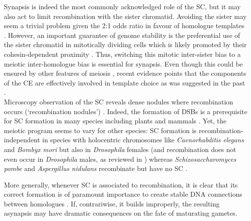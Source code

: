 Synapsis is indeed the most commonly acknowledged role of the SC, but it may also act to limit recombination with the sister chromatid.
Avoiding the sister may seem a trivial problem given the 2:1 odds ratio in favour of homologue templates \citep{lao2010trying}. 
However, an important guarantee of genome stability is the preferential use of the sister chromatid in mitotically dividing cells \citep{kadyk1992sister,bzymek2010double} which is likely promoted by their cohesin-dependent proximity \citep{sjogren2010sphase}.
Thus, switching this mitotic inter-sister bias to a meiotic inter-homologue bias is essential for synapsis.
Even though this could be ensured by other features of meiosis \citep[reviewed in \citealp{humphryes2014non}]{schwacha1997interhomolog, goldfarb2010frequent, hong2013logic}, recent evidence points that the components of the CE are effectively involved in template choice \citep{kim2010sister} as was suggested in the past \citep{haber1998meiosis}.\\

Microscopy observation of the SC reveals dense nodules where recombination occurs (‘recombination nodules’) \citep{carpenter1975electron, schmekel1998evidence}.
Indeed, the formation of DSBs is a prerequisite for SC formation in many species including plants and mammals \citep{zickler1999meiotic, henderson2004tying}.
Yet, the meiotic program seems to vary for other species: SC formation is recombination-independent in species with holocentric chromosomes like \textit{Caenorhabditis elegans} \citep{dernburg1998meiotic} and \textit{Bombyx mori} \citep{rasmussen1977transformation} but also in \textit{Drosophila} females \citep{mckim1998meiotic} (and recombination does not even occur in \textit{Drosophila} males, as reviewed in \citealp{tsai2011homologous}) whereas \textit{Schizosaccharomyces pombe} \citep{bahler1993unusual} and \textit{Aspergillus nidulans} \citep{egel1982meiosis} recombinate but have no SC \citep[reviewed in][]{zickler2015recombination}.

More generally, whenever SC is associated to recombination, it is clear that its correct formation is of paramount importance to create stable DNA connections between homologues \citep[reviewed in \citealp{hunter2003synaptonemal}]{hunter2001singleend}.
If, contrariwise, it builds improperly, the resulting asynapsis may have dramatic consequences on the fate of maturating gametes.







